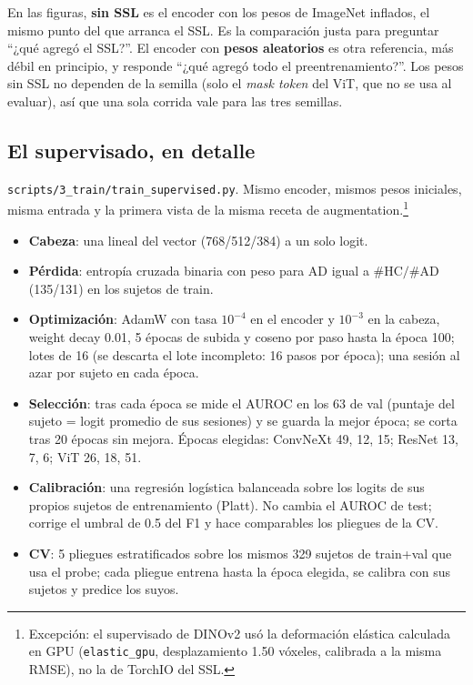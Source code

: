 \documentclass[11pt,a4paper]{article}
\begin{document}
\begin{warnbox}
En las figuras, \textbf{sin SSL} es el encoder con los pesos de ImageNet inflados, el mismo punto del
que arranca el SSL. Es la comparación justa para preguntar ``¿qué agregó el SSL?''. El encoder con
\textbf{pesos aleatorios} es otra referencia, más débil en principio, y responde ``¿qué agregó todo
el preentrenamiento?''. Los pesos sin SSL no dependen de la semilla (solo el \emph{mask token} del
ViT, que no se usa al evaluar), así que una sola corrida vale para las tres semillas.
\end{warnbox}

\subsection{El supervisado, en detalle}

\texttt{scripts/3\_train/train\_supervised.py}. Mismo encoder, mismos pesos iniciales, misma entrada y la
primera vista de la misma receta de augmentation.\footnote{Excepción: el supervisado de DINOv2 usó
la deformación elástica calculada en GPU (\texttt{elastic\_gpu}, desplazamiento 1.50 vóxeles,
calibrada a la misma RMSE), no la de TorchIO del SSL.}
\begin{itemize}
\item \textbf{Cabeza}: una lineal del vector (768/512/384) a un solo logit.
\item \textbf{Pérdida}: entropía cruzada binaria con peso para AD igual a $\#\text{HC}/\#\text{AD}$
  (135/131) en los sujetos de train.
\item \textbf{Optimización}: AdamW con tasa $10^{-4}$ en el encoder y $10^{-3}$ en la cabeza, weight
  decay 0.01, 5 épocas de subida y coseno por paso hasta la época 100; lotes de 16 (se descarta el
  lote incompleto: 16 pasos por época); una sesión al azar por sujeto en cada época.
\item \textbf{Selección}: tras cada época se mide el AUROC en los 63 de val (puntaje del sujeto =
  logit promedio de sus sesiones) y se guarda la mejor época; se corta tras 20 épocas sin mejora.
  Épocas elegidas: ConvNeXt 49, 12, 15; ResNet 13, 7, 6; ViT 26, 18, 51.
\item \textbf{Calibración}: una regresión logística balanceada sobre los logits de sus propios
  sujetos de entrenamiento (Platt). No cambia el AUROC de test; corrige el umbral de 0.5 del F1 y
  hace comparables los pliegues de la CV.
\item \textbf{CV}: 5 pliegues estratificados sobre los mismos 329 sujetos de train+val que usa el
  probe; cada pliegue entrena hasta la época elegida, se calibra con sus sujetos y predice los suyos.
\end{itemize}
\end{document}
